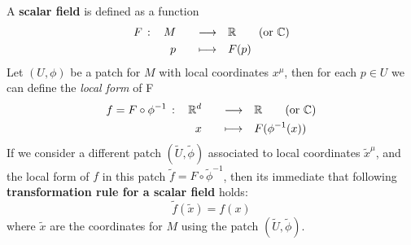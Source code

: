 \documentclass[../main/main.tex]{subfiles}
\begin{document}
\begin{definition}{}
A \textbf{scalar field} is defined as a function
\begin{alignat*}{4}
F\,:\,&&M&&\quad\longrightarrow\quad&\mathbb{R}\qquad(\text{or }\mathbb{C})\\
&&p&&\quad\longmapsto\quad&F(p)
\end{alignat*}
Let $(U,\phi)$ be a patch for $M$ with local coordinates $x^\mu$, then for each $p\in U$ we can define the \emph{local form} of F
\begin{alignat*}{4}
f=F\circ\phi^{-1}\,:\,&&\mathbb{R}^d&&\quad\longrightarrow\quad&\mathbb{R}\qquad(\text{or }\mathbb{C})\\
&&x&&\quad\longmapsto\quad&F(\phi^{-1}(x))
\end{alignat*}
If we consider a different patch $(\tilde U,\tilde \phi)$ associated to local coordinates $\tilde x^\mu$, and the local form of $f$ in this patch $\tilde f=F\circ\tilde\phi^{-1}$, then its immediate that following \textbf{transformation rule for a scalar field} holds:
\[\boxed{\tilde f(\tilde x)=f(x)}\]
where $\tilde x$ are the coordinates for $M$ using the patch $(\tilde U,\tilde \phi)$.
\end{definition}
\end{document}
